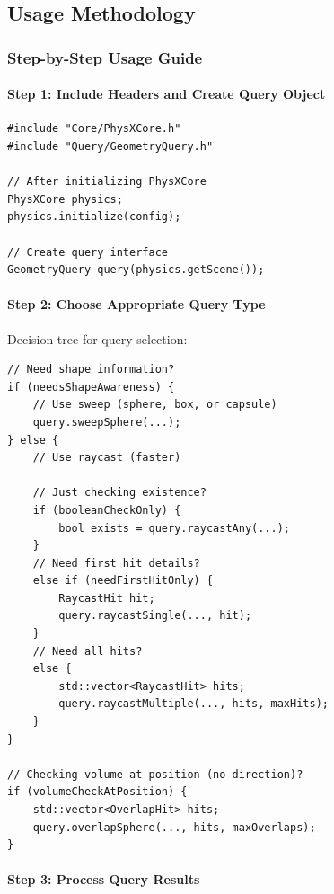 \subsection{Usage Methodology}

\subsubsection{Step-by-Step Usage Guide}

\paragraph{Step 1: Include Headers and Create Query Object}

\begin{lstlisting}[style=cpp]
#include "Core/PhysXCore.h"
#include "Query/GeometryQuery.h"

// After initializing PhysXCore
PhysXCore physics;
physics.initialize(config);

// Create query interface
GeometryQuery query(physics.getScene());
\end{lstlisting}

\paragraph{Step 2: Choose Appropriate Query Type}

Decision tree for query selection:

\begin{lstlisting}[style=cpp]
// Need shape information?
if (needsShapeAwareness) {
    // Use sweep (sphere, box, or capsule)
    query.sweepSphere(...);
} else {
    // Use raycast (faster)

    // Just checking existence?
    if (booleanCheckOnly) {
        bool exists = query.raycastAny(...);
    }
    // Need first hit details?
    else if (needFirstHitOnly) {
        RaycastHit hit;
        query.raycastSingle(..., hit);
    }
    // Need all hits?
    else {
        std::vector<RaycastHit> hits;
        query.raycastMultiple(..., hits, maxHits);
    }
}

// Checking volume at position (no direction)?
if (volumeCheckAtPosition) {
    std::vector<OverlapHit> hits;
    query.overlapSphere(..., hits, maxOverlaps);
}
\end{lstlisting}

\paragraph{Step 3: Process Query Results}

